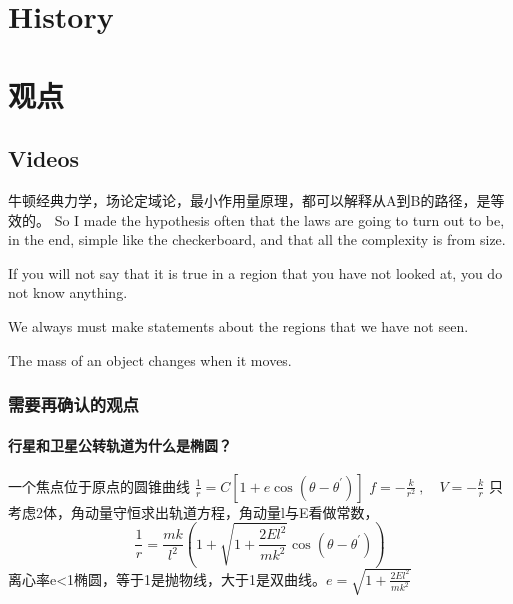 \chapter{History}





\chapter{观点}

\section{Videos}

牛顿经典力学，场论定域论，最小作用量原理，都可以解释从A到B的路径，是等效的。
So I made the hypothesis often that the laws are going to turn out to be, in the end, simple like the checkerboard, and that all the complexity is from size.

If you will not say that it is true in a region that you have not looked at, you do not know anything.

We always must make statements about the regions that we have not seen.

The mass of an object changes when it moves.

\subsection{需要再确认的观点}
\subsubsection{行星和卫星公转轨道为什么是椭圆？}

一个焦点位于原点的圆锥曲线
$\frac{1}{r}=C\left[1+e\cos(\theta-\theta^{\prime})\right]$
$f=-\frac{k}{r^{2}}~,\quad V=-\frac{k}{r}$
只考虑2体，角动量守恒求出轨道方程，角动量l与E看做常数，
$$\frac{1}{r}=\frac{mk}{l^{2}}\left(1+\sqrt{1+\frac{2El^{2}}{mk^{2}}}\cos(\theta-\theta^{\prime})\right)$$
离心率e<1椭圆，等于1是抛物线，大于1是双曲线。$e=\sqrt{1+\frac{2El^{2}}{mk^{2}}}$



